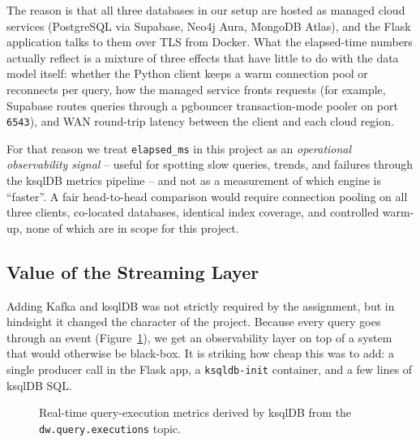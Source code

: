 \documentclass[11pt,a4paper]{article}
\begin{document}
The reason is that all three databases in our setup are hosted as
managed cloud services (PostgreSQL via Supabase, Neo4j Aura, MongoDB
Atlas), and the Flask application talks to them over TLS from Docker.
What the elapsed-time numbers actually reflect is a mixture of three
effects that have little to do with the data model itself: whether the
Python client keeps a warm connection pool or reconnects per query, how
the managed service fronts requests (for example, Supabase routes
queries through a pgbouncer transaction-mode pooler on port
\texttt{6543}), and WAN round-trip latency between the client and each
cloud region.

For that reason we treat \texttt{elapsed\_ms} in this project as an
\emph{operational observability signal} -- useful for spotting slow
queries, trends, and failures through the ksqlDB metrics pipeline --
and not as a measurement of which engine is ``faster''. A fair
head-to-head comparison would require connection pooling on all three
clients, co-located databases, identical index coverage, and controlled
warm-up, none of which are in scope for this project.

\subsection{Value of the Streaming Layer}

Adding Kafka and ksqlDB was not strictly required by the assignment, but
in hindsight it changed the character of the project. Because every
query goes through an event (Figure~\ref{fig:ksql-metrics}), we get an
observability layer on top of a system that would otherwise be
black-box. It is striking how cheap this was to add: a single producer
call in the Flask app, a \texttt{ksqldb-init} container, and a few lines
of ksqlDB SQL.

\begin{figure}[H]
\centering
\caption{Real-time query-execution metrics derived by ksqlDB from the \texttt{dw.query.executions} topic.}
\label{fig:ksql-metrics}
\end{figure}
\end{document}
